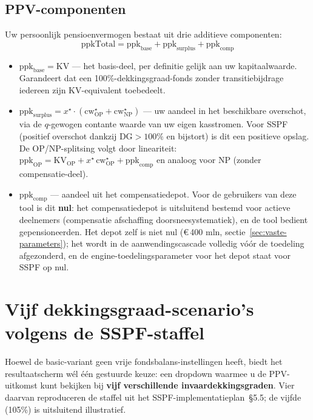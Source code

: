 \documentclass[11pt,a4paper]{article}
\newcommand{\dG}{\text{DG}}
\newcommand{\ppk}{\text{ppk}}
\newcommand{\ppktot}{\text{ppkTotal}}
\begin{document}
\subsection{PPV-componenten}

Uw persoonlijk pensioenvermogen bestaat uit drie additieve componenten:
\begin{equation}
\ppktot = \ppk_{\text{base}} + \ppk_{\text{surplus}} + \ppk_{\text{comp}}
\end{equation}

\begin{itemize}
\item $\ppk_{\text{base}} = \text{KV}$ --- het basis-deel, per definitie gelijk aan uw kapitaalwaarde. Garandeert dat een 100\%-dekkingsgraad-fonds zonder transitiebijdrage iedereen zijn KV-equivalent toebedeelt.
\item $\ppk_{\text{surplus}} = x^{\star} \cdot (\text{cw}^{\star}_{\text{OP}} + \text{cw}^{\star}_{\text{NP}})$ --- uw aandeel in het beschikbare overschot, via de $q$-gewogen contante waarde van uw eigen kasstromen. Voor SSPF (positief overschot dankzij $\dG > 100\%$ en bijstort) is dit een positieve opslag. De OP/NP-splitsing volgt door lineariteit: $\ppk_{\text{OP}} = \text{KV}_{\text{OP}} + x^{\star}\,\text{cw}^{\star}_{\text{OP}} + \ppk_{\text{comp}}$ en analoog voor NP (zonder compensatie-deel).
\item $\ppk_{\text{comp}}$ --- aandeel uit het compensatiedepot. Voor de gebruikers van deze tool is dit \textbf{nul}: het compensatiedepot is uitsluitend bestemd voor actieve deelnemers (compensatie afschaffing doorsneesystematiek), en de tool bedient gepensioneerden. Het depot zelf is niet nul (€\,400 mln, sectie~\ref{sec:vaste-parameters}); het wordt in de aanwendingscascade volledig vóór de toedeling afgezonderd, en de engine-toedelingsparameter voor het depot staat voor SSPF op nul.
\end{itemize}

\section{Vijf dekkingsgraad-scenario's volgens de SSPF-staffel}
\label{sec:dg-staffel}

Hoewel de basic-variant geen vrije fondsbalans-instellingen heeft, biedt het resultaatscherm wél één gestuurde keuze: een dropdown waarmee u de PPV-uitkomst kunt bekijken bij \textbf{vijf verschillende invaardekkingsgraden}. Vier daarvan reproduceren de staffel uit het SSPF-implementatieplan~\S5.5; de vijfde (105\%) is uitsluitend illustratief.
\end{document}
